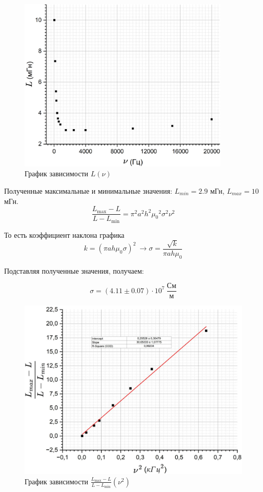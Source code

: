 \documentclass{article}
\begin{document}
	\begin{figure}[H]
		\centering
		\includegraphics[width = 0.9\textwidth]{15_13_31.png}
		\caption{График зависимости $L(\nu)$}
	\end{figure}
	
	Полученные максимальные и минимальные значения: $L_{min} = 2.9$ мГн, $L_{max} = 10$ мГн.
	\begin{equation*}
		\frac{L_{\max} - L}{L - L_{\min}} = \pi ^2 a^2 h^2 {\mu_0}^2 \sigma^2 \nu^2
	\end{equation*}
	
	То есть коэффициент наклона графика
	\[k = (\pi ah\mu_0 \sigma)^2 \ \rightarrow \sigma = \frac{\sqrt{k}}{\pi ah \mu_0}\]
	
	Подставляя полученные значения, получаем:
	
	\begin{equation}
		\sigma = (4.11 \pm 0.07) \cdot 10^7  \ \frac{\text{См}}{\text{м}}
	\end{equation}
	
	\begin{figure}[h!]
		\centering
		\includegraphics[width=\textwidth]{15_13_32.png}
		\caption{График зависимости $\frac{L_{\max} - L}{L - L_{\min}} (\nu^2)$}
	\end{figure}
	
\end{document}
